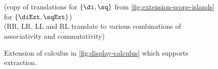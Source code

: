 \begin{figure}[hb]
\begin{mdframed}
    \vspace*{\baselineskip}%
    \begin{pfbox}
    \end{pfbox}
    \begin{pfbox}
    \end{pfbox}
    \\
    \vspace*{\baselineskip}
    \hrulefill
    \\
    \vspace*{\baselineskip}
    (copy of translations for $\{\di,\sq\}$ from
    \autoref{fig:extension-scope-islands} for $\{\diExt,\sqExt\}$)
    \\
    \vspace*{\baselineskip}
    ({RR\diExt}, {LR\diExt}, {LL\diExt} and {RL\diExt} translate to
    various combinations of associativity and commutativity)
    \\
    \vspace*{\baselineskip}
  \end{mdframed}
  \caption{Extension of calculus in \autoref{fig:display-calculus}
    which supports extraction.}
  \label{fig:extension-extraction}
\end{figure}
%
